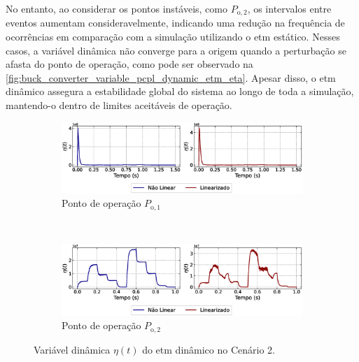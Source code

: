 No entanto, ao considerar os pontos instáveis, como $P_{\mathrm{o}, 2}$, os intervalos entre eventos aumentam consideravelmente, indicando uma redução na frequência de ocorrências em comparação com a simulação utilizando o \acrshort{etm} estático. Nesses casos, a variável dinâmica não converge para a origem quando a perturbação se afasta do ponto de operação, como pode ser observado na \autoref{fig:buck_converter_variable_pcpl_dynamic_etm_eta}. Apesar disso, o \acrshort{etm} dinâmico assegura a estabilidade global do sistema ao longo de toda a simulação, mantendo-o dentro de limites aceitáveis de operação.

\begin{figure}[H]
  \centering
  \captionsetup{justification=centering}
  \begin{subfigure}{1.\textwidth}
    \centering
    \includegraphics[width=1.\textwidth]{figuras/dynamic-etm/buck/sim2/op1/eta.eps}
    \caption{Ponto de operação $P_{\mathrm{o}, 1}$}
    \label{fig:buck_converter_variable_pcpl_dynamic_etm_eta_a}
  \end{subfigure}
  \\[6pt]
  \begin{subfigure}{1.\textwidth}
    \centering
    \includegraphics[width=1.\textwidth]{figuras/dynamic-etm/buck/sim2/op2/eta.eps}
    \caption{Ponto de operação $P_{\mathrm{o}, 2}$}
    \label{fig:buck_converter_variable_pcpl_dynamic_etm_eta_b}

  \end{subfigure}
  \caption{Variável dinâmica $\eta(t)$ do \acrshort{etm} dinâmico no Cenário 2.}
  \label{fig:buck_converter_variable_pcpl_dynamic_etm_eta}
\end{figure}

